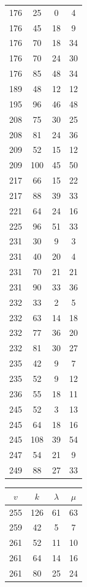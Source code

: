 \documentclass[12pt]{amsproc} %
\theoremstyle{definition}\newtheorem{defn}[thm]{Definition}
\theoremstyle{definition}\newtheorem{rem}[thm]{Remark}
\theoremstyle{definition}\newtheorem{ex}[thm]{Example}
\begin{document}
\begin{table}[ht!]
\begin{minipage}{0.25\textwidth}
\begin{tabular}{c|c|c|c}
            \hline
      176&25&0&4\\ 
      176&45&18&9\\ 
      176&70&18&34\\ 
      176&70&24&30\\ 
      176&85&48&34\\ 
      189&48&12&12\\ 
       195&96&46&48\\ 
      208&75&30&25\\ 
      208&81&24&36\\ 
      209&52&15&12\\ 
      209&100&45&50\\ 
      217&66&15&22\\ 
      217&88&39&33\\ 
      221&64&24&16\\ 
      225&96&51&33\\ 
      231&30&9&3\\ 
      231&40&20&4\\ 
      231&70&21&21\\ 
      231&90&33&36\\ 
      232&33&2&5\\ 
      232&63&14&18\\ 
      232&77&36&20\\ 
      232&81&30&27\\ 
      235&42&9&7\\ 
      235&52&9&12\\ 
      236&55&18&11\\ 
      245&52&3&13\\ 
      245&64&18&16\\ 
      245&108&39&54\\ 
      247&54&21&9\\ 
      249&88&27&33\\ 
        \end{tabular}
    \end{minipage}
    \hfill
    \begin{minipage}{0.25\textwidth}
        \centering
        \begin{tabular}{c|c|c|c}
            $v$ & $k$ & $\lambda$ & $\mu$ \\ 
            \hline
      255&126&61&63\\ 
      259&42&5&7\\ 
      261&52&11&10\\ 
      261&64&14&16\\ 
      261&80&25&24\\ 

\end{tabular}
\end{minipage}
\end{table}
\end{document}
